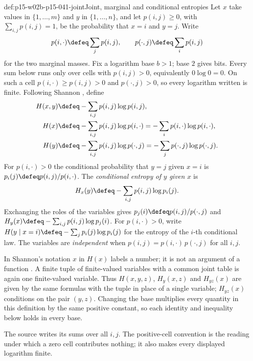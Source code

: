 \begin{hbdefinition}{def:p15-w02b-p15-041-joint}{Joint, marginal and conditional entropies}
Let \(x\) take values in \(\{1,\ldots,m\}\) and \(y\) in
\(\{1,\ldots,n\}\), and let \(p(i,j)\geq0\), with
\(\sum_{i,j}p(i,j)=1\), be the probability that \(x=i\) and \(y=j\).
Write
\[
 p(i,\cdot)\defeq\sum_{j}p(i,j),\qquad p(\cdot,j)\defeq\sum_{i}p(i,j)
\]
for the two marginal masses. Fix a logarithm base \(b>1\); base \(2\)
gives bits. Every sum below runs only over cells with \(p(i,j)>0\),
equivalently \(0\log0=0\). On such a cell \(p(i,\cdot)\geq p(i,j)>0\)
and \(p(\cdot,j)>0\), so every logarithm written is finite.
Following Shannon \cite[p.~12]{Shannon1948MathematicalTheory}, define
\begin{align*}
 H(x,y)&\defeq-\sum_{i,j}p(i,j)\log p(i,j),\\
 H(x)&\defeq-\sum_{i,j}p(i,j)\log p(i,\cdot)
      =-\sum_{i}p(i,\cdot)\log p(i,\cdot),\\
 H(y)&\defeq-\sum_{i,j}p(i,j)\log p(\cdot,j)
      =-\sum_{j}p(\cdot,j)\log p(\cdot,j).
\end{align*}
For \(p(i,\cdot)>0\) the conditional probability that \(y=j\) given
\(x=i\) is \(p_i(j)\defeq p(i,j)/p(i,\cdot)\). The
\emph{conditional entropy of \(y\) given \(x\)} is
\[
 H_x(y)\defeq-\sum_{i,j}p(i,j)\log p_i(j).
\]
Exchanging the roles of the variables gives \(p_j(i)\defeq
p(i,j)/p(\cdot,j)\) and \(H_y(x)\defeq-\sum_{i,j}p(i,j)\log p_j(i)\).
For \(p(i,\cdot)>0\), write
\(H(y\mid x=i)\defeq-\sum_jp_i(j)\log p_i(j)\) for the entropy of the
\(i\)-th conditional law. The variables are \emph{independent} when
\(p(i,j)=p(i,\cdot)\,p(\cdot,j)\) for all \(i,j\).

In Shannon's notation \(x\) in \(H(x)\) labels a number; it is not
an argument of a function \cite[p.~11]{Shannon1948MathematicalTheory}.
A finite tuple of finite-valued variables with a common joint table is
again one finite-valued variable. Thus \(H(x,y,z)\), \(H_y(x,z)\) and
\(H_{yz}(x)\) are given by the same formulas with the tuple in place of
a single variable; \(H_{yz}(x)\) conditions on the pair \((y,z)\).
Changing the base multiplies every quantity in this definition by the
same positive constant, so each identity and inequality below holds in
every base.
\end{hbdefinition}

The source writes its sums over all \(i,j\). The positive-cell
convention is the reading under which a zero cell contributes nothing;
it also makes every displayed logarithm finite.

